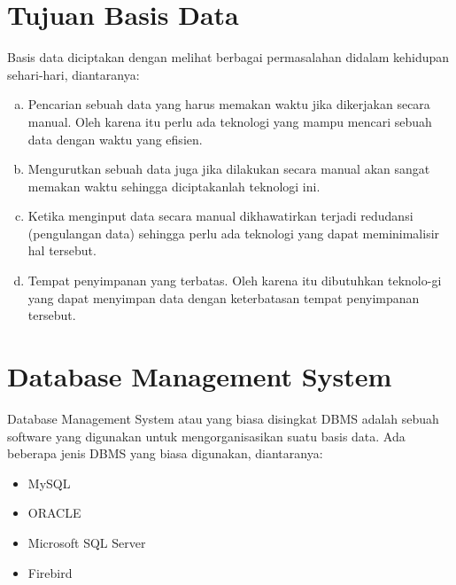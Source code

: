 \documentclass[a4paper,12pt] {article}
\begin{document}
\section{Tujuan Basis Data}
Basis data diciptakan dengan melihat berbagai permasalahan didalam kehidupan sehari-hari, diantaranya:

\begin{enumerate}[a.]
\item Pencarian sebuah data yang harus memakan waktu jika dikerjakan secara manual. Oleh karena itu perlu ada teknologi yang mampu mencari sebuah data dengan waktu yang efisien.
\item Mengurutkan sebuah data juga jika dilakukan secara manual akan sangat memakan waktu sehingga diciptakanlah teknologi ini.
\item Ketika menginput data secara manual dikhawatirkan terjadi redudansi (pengulangan data) sehingga perlu ada teknologi yang dapat meminimalisir hal tersebut.
\item Tempat penyimpanan yang terbatas. Oleh karena itu dibutuhkan teknolo-gi yang dapat menyimpan data dengan keterbatasan tempat penyimpanan tersebut.
\end{enumerate}

\section{Database Management System}
Database Management System atau yang biasa disingkat DBMS adalah sebuah software yang digunakan untuk mengorganisasikan suatu basis data. Ada beberapa jenis DBMS yang biasa digunakan, diantaranya:
\begin{itemize}
\item MySQL
\item ORACLE
\item Microsoft SQL Server
\item Firebird
\end{itemize}
\end{document}
